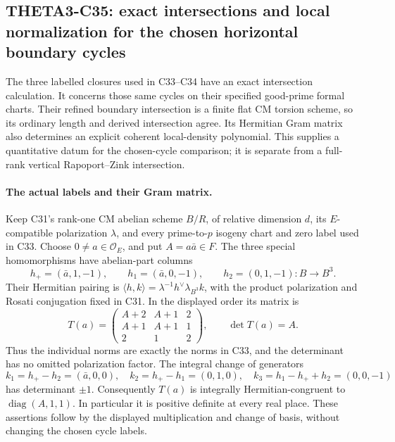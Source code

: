 \subsection{THETA3-C35: exact intersections and local normalization for the chosen horizontal boundary cycles}\label{C35}

The three labelled closures used in C33--C34 have an exact
intersection calculation. It concerns those same cycles on their
specified good-prime formal charts. Their refined boundary
intersection is a finite flat CM torsion scheme, so its ordinary
length and derived intersection agree. Its Hermitian Gram matrix
also determines an explicit coherent local-density polynomial.
This supplies a quantitative datum for the chosen-cycle comparison;
it is separate from a full-rank vertical Rapoport--Zink intersection.

\paragraph{The actual labels and their Gram matrix.}
Keep C31's rank-one CM abelian scheme $B/R$, of relative dimension
$d$, its $E$-compatible polarization $\lambda$, and every
prime-to-$p$ isogeny chart and zero label used in C33. Choose
$0\ne a\in\mathcal O_E$, and put $A=a\bar a\in F$.
The three special homomorphisms have abelian-part columns
\[
 h_+=(\bar a,1,-1),\qquad
 h_1=(\bar a,0,-1),\qquad
 h_2=(0,1,-1):B\longrightarrow B^3.
 \tag{C35a}
\]
Their Hermitian pairing is $\langle h,k\rangle=
\lambda^{-1}h^\vee\lambda_{B^3}k$, with the product
polarization and Rosati conjugation fixed in C31.
In the displayed order its matrix is
\[
 T(a)=
 \begin{pmatrix}
 A+2&A+1&2\\
 A+1&A+1&1\\
 2&1&2
 \end{pmatrix},\qquad \det T(a)=A.
 \tag{C35b}
\]
Thus the individual norms are exactly the norms in C33,
and the determinant has no omitted polarization factor.
The integral change of generators
\[
 k_1=h_+-h_2=(\bar a,0,0),\quad
 k_2=h_+-h_1=(0,1,0),\quad
 k_3=h_1-h_++h_2=(0,0,-1)
 \tag{C35c}
\]
has determinant $\pm1$. Consequently $T(a)$ is integrally
Hermitian-congruent to $\operatorname{diag}(A,1,1)$.
In particular it is positive definite at every real place.
These assertions follow by the displayed multiplication and
change of basis, without changing the chosen cycle labels.

